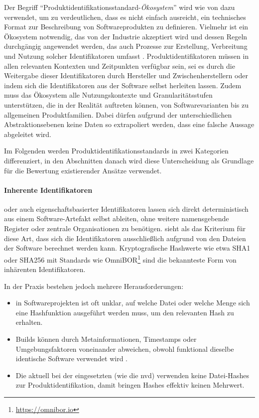Der Begriff \enquote{Produktidentifikationsstandard-\textit{Ökosystem}} wird wie von \citeauthor{CISA2023} dazu verwendet, um zu verdeutlichen, dass es nicht einfach ausreicht, ein technisches Format zur Beschreibung von Softwareprodukten zu definieren.
Vielmehr ist ein Ökosystem notwendig, das von der Industrie akzeptiert wird und dessen Regeln durchgängig angewendet werden, das auch Prozesse zur Erstellung, Verbreitung und Nutzung solcher Identifikatoren umfasst \autocite{CISA2023}.
Produktidentifikatoren müssen in allen relevanten Kontexten und Zeitpunkten verfügbar sein, sei es durch die Weitergabe dieser Identifikatoren durch Hersteller und Zwischenherstellern oder indem sich die Identifikatoren aus der Software selbst herleiten lassen.
Zudem muss das Ökosystem alle Nutzungskontexte und Granularitätsstufen unterstützen, die in der Realität auftreten können, von Softwarevarianten bis zu allgemeinen Produktfamilien.
Dabei dürfen aufgrund der unterschiedlichen Abstraktionsebenen keine Daten so extrapoliert werden, dass eine falsche Aussage abgeleitet wird.

Im Folgenden werden Produktidentifikationsstandards in zwei Kategorien differenziert, in den Abschnitten danach wird diese Unterscheidung als Grundlage für die Bewertung existierender Ansätze verwendet.

\paragraph{Inherente Identifikatoren} %
oder auch eigenschaftsbasierter Identifikatoren lassen sich direkt deterministisch aus einem Software-Artefakt selbst ableiten, ohne weitere namensgebende Register oder zentrale Organisationen zu benötigen.
\citeauthor{CISA2023} sieht als das Kriterium für diese Art, dass sich die Identifikatoren ausschließlich aufgrund von den Dateien der Software berechnet werden kann.
Kryptografische Hashwerte wie etwa SHA1 oder SHA256 mit Standards wie OmniBOR\footnote{\url{https://omnibor.io}} sind die bekannteste Form von inhärenten Identifikatoren.

In der Praxis bestehen jedoch mehrere Herausforderungen:
\begin{itemize}
    \item in Softwareprojekten ist oft unklar, auf welche Datei oder welche Menge sich eine Hashfunktion ausgeführt werden muss, um den relevanten Hash zu erhalten.

    \item Builds können durch Metainformationen, Timestamps oder Umgebungsfaktoren voneinander abweichen, obwohl funktional dieselbe identische Software verwendet wird \autocite{CISA2023}.

    \item Die aktuell bei der \metaeffektsp eingesetzten  (wie die \acrshort{nvd}) verwenden keine Datei-Hashes zur Produktidentifikation, damit bringen Hashes effektiv keinen Mehrwert.
\end{itemize}

